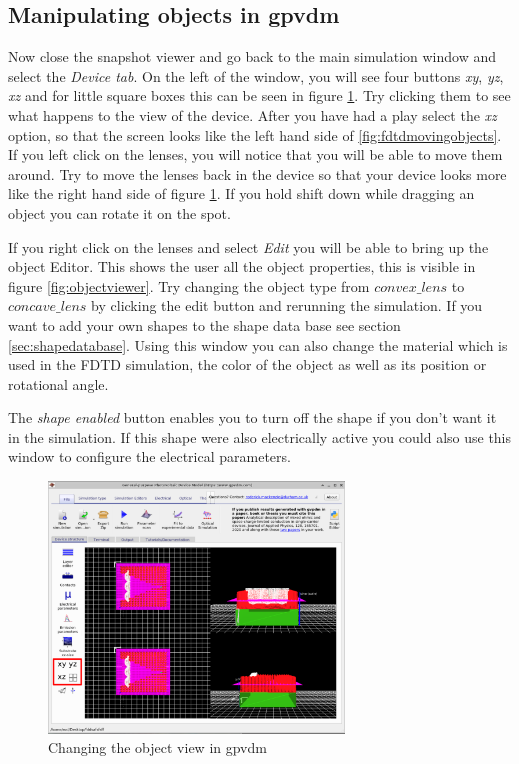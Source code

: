 \subsection{Manipulating objects in gpvdm}
Now close the snapshot viewer and go back to the main simulation window and select the \emph{Device tab}.  On the left of the window, you will see four buttons \emph{xy}, \emph{yz}, \emph{xz} and for little square boxes this can be seen in figure \ref{fig:fdtdmainwindow}. Try clicking them to see what happens to the view of the device.  After you have had a play select the \emph{xz} option, so that the screen looks like the left hand side of \ref{fig:fdtdmovingobjects}.  If you left click on the lenses, you will notice that you will be able to move them around. Try to move the lenses back in the device so that your device looks more like the right hand side of figure \ref{fig:fdtdmainwindow}.  If you hold shift down while dragging an object you can rotate it on the spot.

If you right click on the lenses and select \emph{Edit} you will be able to bring up the object Editor.  This shows the user all the object properties, this is visible in figure \ref{fig:objectviewer}. Try changing the object type from $convex\_lens$ to $concave\_ lens$ by clicking the edit button and rerunning the simulation.  If you want to add your own shapes to the shape data base see section \ref{sec:shapedatabase}. Using this window you can also change the material which is used in the FDTD simulation, the color of the object as well as its position or rotational angle.

The \emph{shape enabled} button enables you to turn off the shape if you don't want it in the simulation. If this shape were also electrically active you could also use this window to configure the electrical parameters.

 
\begin{figure}[H]
\centering
\includegraphics[width=0.7\textwidth]{./images/fdtd_7.png}
\caption{Changing the object view in gpvdm}
\label{fig:fdtdmainwindow}
\end{figure}

